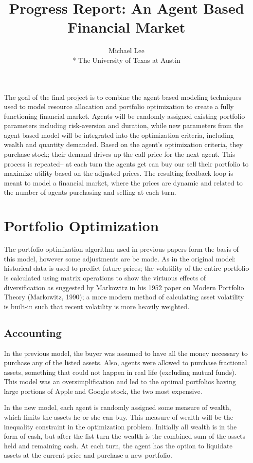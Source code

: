 \documentclass{article}
\title{Progress Report: An Agent Based Financial Market}
\author{Michael Lee \\*
The University of Texas at Austin}
\begin{document}
\maketitle{}


The goal of the final project is to combine the agent based modeling techniques used to model resource allocation and portfolio optimization to create a fully functioning financial market. Agents will be randomly assigned existing portfolio parameters including risk-aversion and duration, while new parameters from the agent based model will be integrated into the optimization criteria, including wealth and quantity demanded. Based on the agent's optimization criteria, they purchase stock; their demand drives up the call price for the next agent. This process is repeated-- at each turn the agents get can buy our sell their portfolio to maximize utility based on the adjusted prices. The resulting feedback loop is meant to model a financial market, where the prices are dynamic and related to the number of agents purchasing and selling at each turn. 

\newpage{}

\section{Portfolio Optimization}
The portfolio optimization algorithm used in previous papers form the basis of this model, however some adjustments are be made. As in the original model: historical data is used to predict future prices; the volatility of the entire portfolio is calculated using matrix operations to show the virtuous effects of diversification as suggested by Markowitz in his 1952 paper on Modern Portfolio Theory (Markowitz, 1990); a more modern method of calculating asset volatility is built-in such that recent volatility is more heavily weighted. 

\subsection{Accounting}
In the previous model, the buyer was assumed to have all the money necessary to purchase any of the listed assets. Also, agents were allowed to purchase fractional assets, something that could not happen in real life (excluding mutual funds). This model was an oversimplification and led to the optimal portfolios having large portions of Apple and Google stock, the two most expensive. \*

In the new model, each agent is randomly assigned some measure of wealth, which limits the assets he or she can buy. This measure of wealth will be the inequality constraint in the optimization problem. Initially all wealth is in the form of cash, but after the fist turn the wealth is the combined sum of the assets held and remaining cash. At each turn, the agent has the option to liquidate assets at the current price and purchase a new portfolio.
\end{document}
